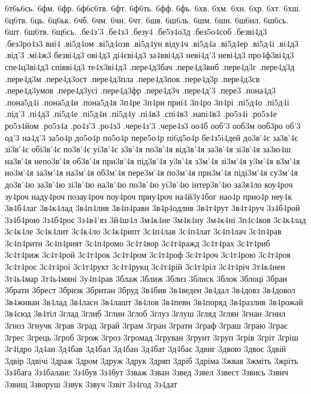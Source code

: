 {6т6ь6сь. 6фм. 6фр. 6ф6с6тв. 6фт. 6ф6ть. 6фф. 6фь.
6хв. 6хм. 6хн. 6хр. 6хт. 6хш. 6ц6тв. 6ць.
6ц6ьк. 6чб. 6чм. 6чн. 6чт. 6шв. 6ш6ль. 6шм.
6шн. 6ш6нл. 6ш6сь. 6шт. 6ш6тв. 6щ6сь.
.бе4з'3
.бе4з3
.безу4
.бе5з4о3д
.без5о4соб
.безві4д3
.без3ро4з3
виї4
.ві5д4ом
.ві5д4озв
.ві5д4ун
віду4ч
.ві5д4а
.ві5д4ер
.ві5д4і
.ві4д3
.від'3
.мі4ж3
безві4д3
ові4д3
ді4єві4д3
за4вві4д3
неві4д'3
неві4д3
про4ф3ві4д3
спе4ц3ві4д3
співві4д3
те4х3ві4д3
.пере4д3бач
.пере4д3виб
.пере4д3г
.пере4д3д
.пере4д3м
.пере4д3ост
.пере4д3пла
.пере4д3пок
.пере4д3р
.пере4д3св
.пере4д3умов
.пере4д3усі
.пере4д3фр
.пере4д3ч
.пере4д'3
.пере3
.пона4д3
.пона5д4і
.пона5д4и
.пона5д4я
3п4ре
3п4ри
приї4
3п4ро
3п4рі
.пі5д4о
.пі5д4і
.під'3
.пі4д3
.пі5д4е
.пі5д4и
.пі5д4у
.пі4в3
.спі4в3
.напі4в3
.ро5з4і
.ро5з4е
ро5з4йом
.ро5з4а
.ро4з'3
.ро4з3
.чере4з'3
.чере4з3
оо4б
ооб'3
ооб3м
ооб3ро
об'3
од'3
на4д'3
за5о4р
до5о4р
по5о4р
пере5о4р
пі6д5о4р
бе4з5і4дей
до3в'4є
за3в'4є
зі3в'4є
обі3в'4є
по3в'4є
уі3в'4є
з3в'4я
по3в'4я
від3в'4я
за3в'4я
зі3в'4я
за3ю4ш
на3в'4я
непо3в'4я
об3в'4я
при3в'4я
під3в'4я
у3в'4я
з3м'4я
зі3м'4я
у3м'4я
в3м'4я
но3м'4я
за3м'4я
на3м'4я
об3м'4я
пере3м'4я
по3м'4я
при3м'4я
піді3м'4я
су3м'4я
до3в'4ю
за3в'4ю
зі3в'4ю
на3в'4ю
по3в'4ю
уі3в'4ю
інтер3в'4ю
за3я4ло
коу4роч
зу4роч
наду4роч
позау4роч
поу4роч
приу4роч
на4й3у4бог
нао4р
прио4р
неу4к
3в4б4лаг
3в4к4лад
3в4п4лив
3в4п4равн
3в4р4одлив
3в4т4рут
3в4т4руч
3з4б4рой
3з4б4рою
3з4б4роє
3з4в4'яз
3й4ш4л
3м4к4не
3м4к4ну
3м4к4ні
3п4с4ков
3с4к4лад
3с4к4ле
3с4к4лит
3с4к4ло
3с4к4рипт
3с4п4лав
3с4п4лат
3с4п4лач
3с4п4рав
3с4п4ритн
3с4п4рият
3с4п4ромо
3с4т4вор
3с4т4ражд
3с4т4рах
3с4т4риб
3с4т4риж
3с4т4рой
3с4т4рок
3с4т4ром
3с4т4роф
3с4т4роч
3с4т4рою
3с4т4роя
3с4т4роє
3с4т4рої
3с4т4рукт
3с4т4рукц
3с4т4рій
3с4т4ріл
3с4т4річ
3т4к4нен
3т4ь4мар
3т4ь4мяні
3у4п4рав
3блаж
3ближ
3близ
3блиск
3блок
3блоці
3бран
3брати
3брест
3бризк
3британ
3бруд
3в4бив
3в4веден
3в4дал
3в4довз
3в4довол
3в4живан
3в4лад
3в4ласн
3в4лашт
3в4лов
3в4певн
3в4поряд
3в4разлив
3в4рожай
3в4сюд
3в4тіл
3глад
3глиб
3глин
3глоб
3глуз
3глуш
3гляд
3глян
3гнан
3гнил
3гноз
3гнучк
3грав
3град
3грай
3грам
3гран
3грати
3граф
3граш
3граю
3грає
3грес
3грець
3гроб
3грож
3гроз
3громад
3груван
3грунт
3груп
3грів
3гріт
3гріш
3г4ідро
3д4ан
3д4бав
3д4бал
3д4бан
3д4бат
3д4бає
3двиг
3двою
3двоє
3двій
3двір
3двічі
3драж
3дром
3друж
3друк
3дряп
3дріб
3дріма
3жвав
3жміть
3жріть
3з4бага
3з4баланс
3з4був
3з4бут
3зваж
3зван
3звед
3звел
3звест
3звись
3звич
3звищ
3зворуш
3звук
3звуч
3звіт
3з4год
3з4дат
}
